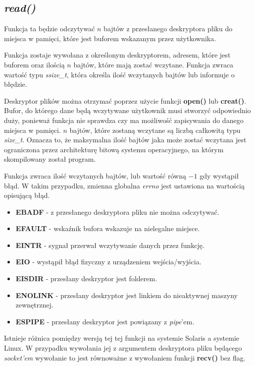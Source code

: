 \documentclass{article}
\begin{document}
\subsection{\textit{read()}}
Funkcja ta będzie odczytywać $n$ bajtów z przesłanego deskryptora pliku do miejsca w pamięci,
które jest buforem wskazanym przez użytkownika.

Funkcja zostaje wywołana z określonym deskryptorem, adresem, które jest buforem oraz ilością $n$ bajtów, które mają zostać wczytane. Funkcja zwraca wartość typu \textit{ssize\_t}, która określa ilość wczytanych bajtów lub informuje o błędzie.

Deskryptor plików można otrzymać poprzez użycie funkcji \textbf{open()} lub \textbf{creat()}.
Bufor, do którego dane będą wczytywane użytkownik musi stworzyć odpowiednio duży, ponieważ funkcja nie sprawdza czy ma możliwość zapisywania do danego miejsca w pamięci.
$n$ bajtów, które zostaną wczytane są liczbą całkowitą typu \textit{size\_t}.
Oznacza to, że maksymalna ilość bajtów jaka może zostać wczytana jest ograniczona przez architekturę bitową systemu operacyjnego, na którym skompilowany został program.

Funkcja zwraca ilość wczytanych bajtów, lub wartość równą $-1$ gdy wystąpił błąd.
W takim przypadku, zmienna globalna \textit{errno} jest ustawiona na wartością opisującą błąd.

\begin{itemize}
\item \textbf{EBADF} - z przesłanego deskryptora pliku nie można odczytywać.
\item \textbf{EFAULT} - wskaźnik bufora wskazuje na nielegalne miejsce.
\item \textbf{EINTR} - sygnał przerwał wczytywanie danych przez funkcję.
\item \textbf{EIO} - wystąpił błąd fizyczny z urządzeniem wejścia/wyjścia.
\item \textbf{EISDIR} - przesłany deskryptor jest folderem.
\item \textbf{ENOLINK} - przesłany deskryptor jest linkiem do nieaktywnej maszyny zewnętrznej.
\item \textbf{ESPIPE} - przesłany deskryptor jest powiązany z \textit{pipe}'em.
\end{itemize}

Istnieje różnica pomiędzy wersją tej tej funkcji na systemie Solaris a systemie Linux.
W przypadku wywołania jej z argumentem deskryptora pliku będącego \textit{socket'em} wywołanie to jest równoważne z wywołaniem funkcji \textbf{recv()} bez flag.
\end{document}
